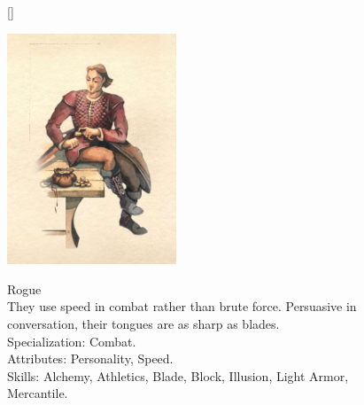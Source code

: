 \documentclass[12pt]{book}
\begin{document}
\begin{figure}[H]
[\FBwidth]
{\caption*{Rogue\\

They use speed in combat rather than brute force. Persuasive in conversation, their tongues are as sharp as blades.\\

Specialization: Combat.\\

Attributes: Personality, Speed.\\

Skills: Alchemy, Athletics, Blade, Block, Illusion, Light Armor, Mercantile.}\label{fig:test}}
{\includegraphics[width=0.45\textwidth]{Rogue.png}}
\end{figure}
\end{document}
